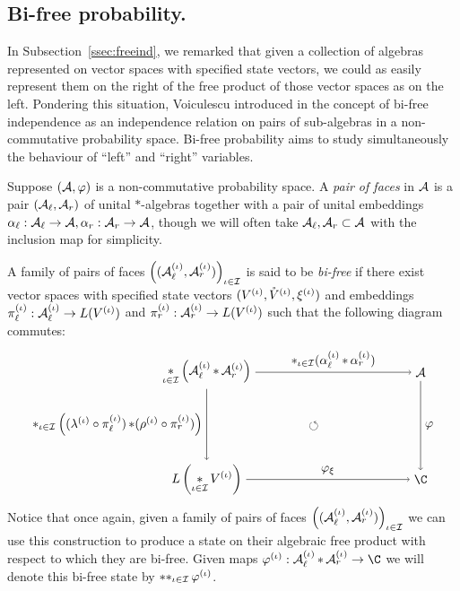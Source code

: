 \subsection{Bi-free probability.}
\label{ss:introbifree}
In Subsection~\ref{ssec:freeind}, we remarked that given a collection of algebras represented on vector spaces with specified state vectors, we could as easily represent them on the right of the free product of those vector spaces as on the left.
Pondering this situation, Voiculescu introduced in \cite{voiculescu2014free} the concept of bi-free independence as an independence relation on pairs of sub-algebras in a non-commutative probability space.
Bi-free probability aims to study simultaneously the behaviour of ``left'' and ``right'' variables.

\begin{definition}
	Suppose $(\mathcal{A}, \varphi)$ is a non-commutative probability space.
	A \emph{pair of faces} in $\mathcal{A}$ is a pair $(\mathcal{A}_\ell, \mathcal{A}_r)$ of unital $*$-algebras together with a pair of unital embeddings $\alpha_\ell : \mathcal{A}_\ell \to \mathcal{A}, \alpha_r : \mathcal{A}_r \to \mathcal{A}$, though we will often take $\mathcal{A}_\ell, \mathcal{A}_r \subset \mathcal{A}$ with the inclusion map for simplicity.
	
	A family of pairs of faces $\left((\mathcal{A}_\ell^{(\iota)}, \mathcal{A}_r^{(\iota)})\right)_{\iota\in\mathcal{I}}$ is said to be \emph{bi-free} if there exist vector spaces with specified state vectors $(V^{(\iota)}, \mathring{V}^{(\iota)}, \xi^{(\iota)})$ and embeddings $\pi_\ell^{(\iota)} : \mathcal{A}^{(\iota)}_\ell \to L(V^{(\iota)})$ and $\pi_r^{(\iota)} : \mathcal{A}^{(\iota)}_r \to L(V^{(\iota)})$ such that the following diagram commutes:
	\[\begin{tikzpicture}
		\node (q) at (-3, 1.5) {$\displaystyle\st_{\iota\in\I}\paren{\A^{(\iota)}_\ell\st\A^{(\iota)}_r}$};
		\node (a) at (-3, -1.5) {$L\paren{\displaystyle\st_{\iota\in\I}V^{(\iota)}}$};
		\node (w) at (3, 1.5) {$\A$};
		\node (s) at (3, -1.5) {$\C$};
		\node at (0,0) {$\circlearrowleft$};

		\draw [->] (q) -- node[above] {$\st_{\iota\in\I} (\alpha^{(\iota)}_\ell\st\alpha^{(\iota)}_r)$} (w);
		\draw [->] (q) -- node[left] {$\st_{\iota\in\I} \paren{(\lambda^{(\iota)}\circ\pi_\ell^{(\iota)}) \st (\rho^{(\iota)}\circ\pi_r^{(\iota)})}$} (a);
		\draw [->] (a) -- node[above] {$\varphi_\xi$} (s);
		\draw [->] (w) -- node[right] {{$\varphi$}} (s);
	\end{tikzpicture}\]
Notice that once again, given a family of pairs of faces $\left((\mathcal{A}_\ell^{(\iota)}, \mathcal{A}_r^{(\iota)})\right)_{\iota\in\mathcal{I}}$ we can use this construction to produce a state on their algebraic free product with respect to which they are bi-free.
	Given maps $\varphi^{(\iota)} : \A_\ell^{(\iota)}\st\A_r^{(\iota)} \to \C$ we will denote this bi-free state by $\mathop{\ast\ast}_{\iota\in\mathcal{I}}\varphi^{(\iota)}$.
\end{definition}

